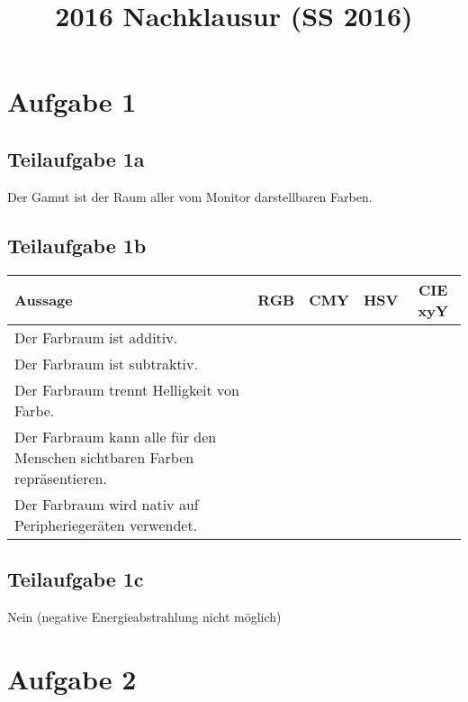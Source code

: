 \documentclass[a4paper]{scrartcl}
\begin{document}
\title{2016 Nachklausur (SS 2016)}

\setcounter{section}{1}
\section*{Aufgabe 1}
\subsection*{Teilaufgabe 1a}
Der Gamut ist der Raum aller vom Monitor darstellbaren Farben.

\subsection*{Teilaufgabe 1b}
\begin{tabular}{p{7cm}cccc}\toprule
	\textbf{Aussage}                                                          & \textbf{RGB} & \textbf{CMY} & \textbf{HSV} & \textbf{CIE xyY}\\\midrule
	Der Farbraum ist additiv.                                                 & \CheckedBox  & \Square      & \Square      & \Square         \\
	Der Farbraum ist subtraktiv.                                              & \Square      & \CheckedBox  & \Square      & \Square         \\
	Der Farbraum trennt Helligkeit von Farbe.                                 & \Square      & \Square      & \CheckedBox  & \CheckedBox     \\
	Der Farbraum kann alle für den Menschen sichtbaren Farben repräsentieren. & \Square      & \Square      & \Square      & \CheckedBox     \\
	Der Farbraum wird nativ auf Peripheriegeräten verwendet.                  & \CheckedBox  & \CheckedBox  & \Square      & \Square         \\\bottomrule
\end{tabular}

\subsection*{Teilaufgabe 1c}
Nein (negative Energieabstrahlung nicht möglich)

\section*{Aufgabe 2}
\end{document}

